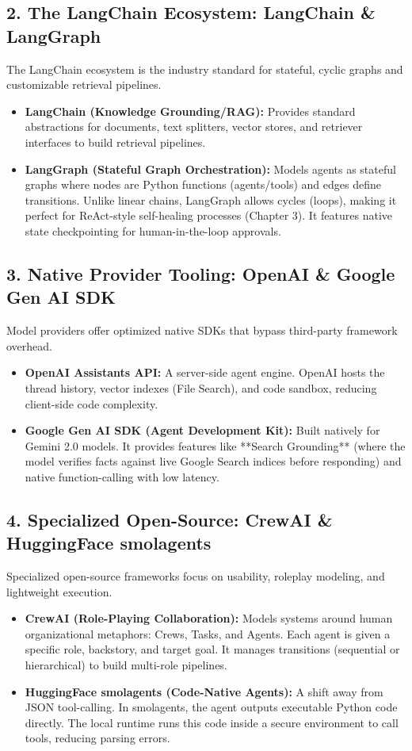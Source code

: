 \subsection{2. The LangChain Ecosystem: LangChain \& LangGraph}
The LangChain ecosystem is the industry standard for stateful, cyclic graphs and customizable retrieval pipelines.
\begin{itemize}
    \item \textbf{LangChain (Knowledge Grounding/RAG):} Provides standard abstractions for documents, text splitters, vector stores, and retriever interfaces to build retrieval pipelines.
    \item \textbf{LangGraph (Stateful Graph Orchestration):} Models agents as stateful graphs where nodes are Python functions (agents/tools) and edges define transitions. Unlike linear chains, LangGraph allows cycles (loops), making it perfect for ReAct-style self-healing processes (Chapter 3). It features native state checkpointing for human-in-the-loop approvals.
\end{itemize}

\subsection{3. Native Provider Tooling: OpenAI \& Google Gen AI SDK}
Model providers offer optimized native SDKs that bypass third-party framework overhead.
\begin{itemize}
    \item \textbf{OpenAI Assistants API:} A server-side agent engine. OpenAI hosts the thread history, vector indexes (File Search), and code sandbox, reducing client-side code complexity.
    \item \textbf{Google Gen AI SDK (Agent Development Kit):} Built natively for Gemini 2.0 models. It provides features like **Search Grounding** (where the model verifies facts against live Google Search indices before responding) and native function-calling with low latency.
\end{itemize}

\subsection{4. Specialized Open-Source: CrewAI \& HuggingFace smolagents}
Specialized open-source frameworks focus on usability, roleplay modeling, and lightweight execution.
\begin{itemize}
    \item \textbf{CrewAI (Role-Playing Collaboration):} Models systems around human organizational metaphors: Crews, Tasks, and Agents. Each agent is given a specific role, backstory, and target goal. It manages transitions (sequential or hierarchical) to build multi-role pipelines.
    \item \textbf{HuggingFace smolagents (Code-Native Agents):} A shift away from JSON tool-calling. In smolagents, the agent outputs executable Python code directly. The local runtime runs this code inside a secure environment to call tools, reducing parsing errors.
\end{itemize}

